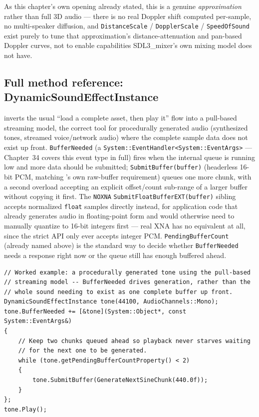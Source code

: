 As this chapter's own opening already stated, this is a genuine \emph{approximation} rather
than full 3D audio --- there is no real Doppler shift computed per-sample, no multi-speaker
diffusion, and \texttt{DistanceScale} / \texttt{DopplerScale} / \texttt{SpeedOfSound} exist purely
to tune that approximation's distance-attenuation and pan-based Doppler curves, not to enable
capabilities SDL3\_mixer's own mixing model does not have.

\subsection{Full method reference: DynamicSoundEffectInstance}

 inverts the usual ``load a complete asset, then play
it'' flow into a pull-based streaming model, the correct tool for procedurally generated audio
(synthesized tones, streamed voice/network audio) where the complete sample data does not
exist up front. \texttt{BufferNeeded} (a \texttt{System::EventHandler<System::EventArgs>} ---
Chapter~34 covers this event type in full) fires when the internal queue is running low and
more data should be submitted; \texttt{SubmitBuffer(buffer)} (headerless 16-bit PCM, matching
's own raw-buffer requirement) queues one more chunk, with a second
overload accepting an explicit offset/count sub-range of a larger buffer without copying it
first. The \texttt{NOXNA} \texttt{SubmitFloatBufferEXT(buffer)} sibling accepts normalized
\texttt{float} samples directly instead, for application code that already generates audio in
floating-point form and would otherwise need to manually quantize to 16-bit integers first ---
real XNA has no equivalent at all, since the strict API only ever accepts integer PCM.
\texttt{PendingBufferCount} (already named above) is the standard way to decide whether
\texttt{BufferNeeded} needs a response right now or the queue still has enough buffered ahead.

\begin{lstlisting}
// Worked example: a procedurally generated tone using the pull-based
// streaming model -- BufferNeeded drives generation, rather than the
// whole sound needing to exist as one complete buffer up front.
DynamicSoundEffectInstance tone(44100, AudioChannels::Mono);
tone.BufferNeeded += [&tone](System::Object*, const System::EventArgs&)
{
    // Keep two chunks queued ahead so playback never starves waiting
    // for the next one to be generated.
    while (tone.getPendingBufferCountProperty() < 2)
    {
        tone.SubmitBuffer(GenerateNextSineChunk(440.0f));
    }
};
tone.Play();
\end{lstlisting}

